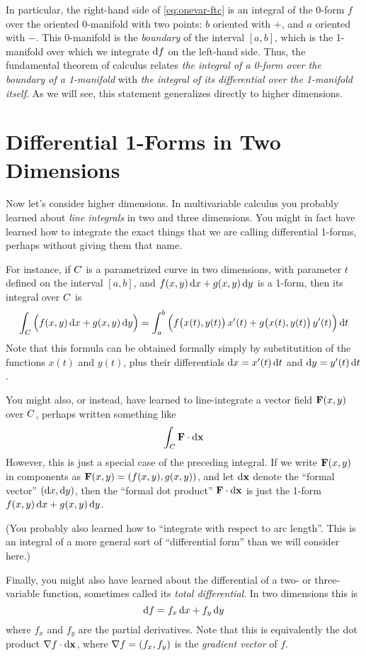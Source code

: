 \documentclass[12pt]{amsart}
\begin{document}
In particular, the right-hand side of \cref{eq:onevar-ftc} is an integral of the 0-form $f$ over the oriented $0$-manifold with two points: $b$ oriented with $+$, and $a$ oriented with $-$.
This 0-manifold is the \emph{boundary} of the interval $[a,b]$, which is the 1-manifold over which we integrate ${\mathrm{d} f}$ on the left-hand side.
Thus, the fundamental theorem of calculus relates \emph{the integral of a 0-form over the boundary of a 1-manifold} with \emph{the integral of its differential over the 1-manifold itself}.
As we will see, this statement generalizes directly to higher dimensions.


\section{Differential 1-Forms in Two Dimensions}
\label{sec:1forms-in-2D}

Now let's consider higher dimensions.
In multivariable calculus you probably learned about \emph{line integrals} in two and three dimensions.
You might in fact have learned how to integrate the exact things that we are calling differential 1-forms, perhaps without giving them that name.

For instance, if $C$ is a parametrized curve in two dimensions, with parameter $t$ defined on the interval $[a,b]$, and $f(x,y)\,{\mathrm{d} x} + g(x,y)\,{\mathrm{d} y}$ is a 1-form, then its integral over $C$ is
\[ \int_{C} \Big(f(x,y)\,{\mathrm{d} x} + g(x,y)\,{\mathrm{d} y}\Big) = \int_a^b \Big( f\big(x(t),y(t)\big)\, x'(t) + g\big(x(t),y(t)\big)\,y'(t)\Big) \,{\mathrm{d} t} \]
Note that this formula can be obtained formally simply by substitutition of the functions $x(t)$ and $y(t)$, plus their differentials ${\mathrm{d} x} = x'(t)\,{\mathrm{d} t}$ and ${\mathrm{d} y} = y'(t)\,{\mathrm{d} t}$.

You might also, or instead, have learned to line-integrate a vector field $\mathbf{F}(x,y)$ over $C$, perhaps written something like
\[ \int_{C} \mathbf{F} \cdot {\ensuremath{\mathrm{d} \mathbf{x}}} \]
However, this is just a special case of the preceding integral.
If we write $\mathbf{F}(x,y)$ in components as $\mathbf{F}(x,y) = (f(x,y),g(x,y))$, and let ${\mathrm{d} \mathbf{x}}$ denote the ``formal vector'' $({\mathrm{d} x},{\mathrm{d} y})$, then the ``formal dot product'' $\mathbf{F} \cdot {\ensuremath{\mathrm{d} \mathbf{x}}}$ is just the 1-form $f(x,y)\,{\mathrm{d} x} + g(x,y)\,{\mathrm{d} y}$.

(You probably also learned how to ``integrate with respect to arc length''.
This is an integral of a more general sort of ``differential form'' than we will consider here.)

Finally, you might also have learned about the differential of a two- or three-variable function, sometimes called its \emph{total differential}.
In two dimensions this is
\begin{equation}
  {\ensuremath{\mathrm{d} f}} = f_x \,{\mathrm{d} x} + f_y \,{\mathrm{d} y}\label{eq:differential-of-a-0form-in-2D}
\end{equation}
where $f_x$ and $f_y$ are the partial derivatives.
Note that this is equivalently the dot product $\nabla f \cdot {\ensuremath{\mathrm{d} \mathbf{x}}}$, where $\nabla f = (f_x,f_y)$ is the \emph{gradient vector} of $f$.
\end{document}
